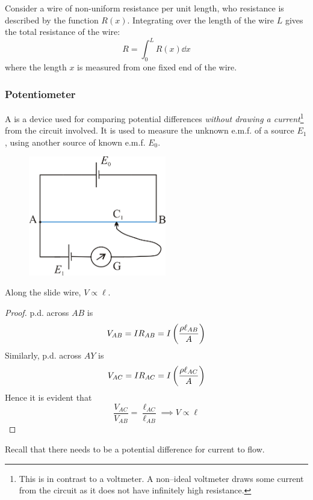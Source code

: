 \begin{tcolorbox}
Consider a wire of non-uniform resistance per unit length, who resistance is described by the function $R(x)$. Integrating over the length of the wire $L$ gives the total resistance of the wire:
\[ R = \int_0^L R(x) \dd{x} \]
where the length $x$ is measured from one fixed end of the wire.
\end{tcolorbox}

\subsubsection{Potentiometer}
A  is a device used for comparing potential differences \emph{without drawing a current}\footnote{This is in contrast to a voltmeter. A non--ideal voltmeter draws some current from the circuit as it does not have infinitely high resistance.} from the circuit involved. It is used to measure the unknown e.m.f. of a source $E_1$, using another source of known e.m.f. $E_0$.

\begin{figure}[H]
    \centering
    \includegraphics[width=6cm]{images/potentiometer.png}
\end{figure}

\begin{proposition}
Along the slide wire, $V \propto \ell$.
\end{proposition}
\begin{proof}
p.d. across $AB$ is
\[ V_{AB} = IR_{AB} = I\left(\frac{\rho\ell_{AB}}{A}\right) \]
Similarly, p.d. across $AY$ is
\[ V_{AC} = IR_{AC} = I\left(\frac{\rho\ell_{AC}}{A}\right) \]
Hence it is evident that 
\[ \frac{V_{AC}}{V_{AB}} = \frac{\ell_{AC}}{\ell_{AB}} \implies \boxed{V \propto \ell} \]
\end{proof}

\begin{remark}
Recall that there needs to be a potential difference for current to flow.
\end{remark}


